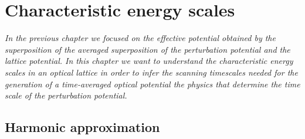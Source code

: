 \chapter{Characteristic energy scales}\label{ch:energy_scales}

\textit{In the previous chapter we focused on the effective potential obtained
by the superposition of the averaged superposition of the perturbation
potential and the lattice potential. In this chapter we want to understand the
characteristic energy scales in an optical lattice in order to infer the
scanning timescales needed for the generation of a time-averaged optical
potential the physics that determine the time scale of the perturbation
potential.}

\section{Harmonic approximation}

